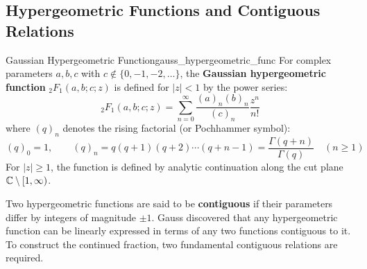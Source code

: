 \documentclass[a4paper]{article}
\begin{document}
\subsection{Hypergeometric Functions and Contiguous Relations}\label{cf:subsec:hypergeometric-and-contiguous-relations}

\begin{mydefinition}{Gaussian Hypergeometric Function}{gauss_hypergeometric_func}
  For complex parameters $a, b, c$ with $c \notin \{0, -1, -2, \dots\}$, the \textbf{Gaussian hypergeometric function} ${_2F_1}(a, b; c; z)$ is defined for $|z| < 1$ by the power series:
  \[
    {_2F_1}(a, b; c; z) = \sum_{n=0}^{\infty} \frac{(a)_n (b)_n}{(c)_n} \frac{z^n}{n!}
  \]
  where $(q)_n$ denotes the rising factorial (or Pochhammer symbol):
  \[
    (q)_0 = 1, \qquad (q)_n = q(q+1)(q+2)\cdots(q+n-1) = \frac{\Gamma(q+n)}{\Gamma(q)} \quad (n \ge 1)
  \]
  For $|z| \ge 1$, the function is defined by analytic continuation along the cut plane $\mathbb{C} \setminus [1, \infty)$.
\end{mydefinition}

Two hypergeometric functions are said to be \textbf{contiguous} if their parameters differ by integers of magnitude $\pm 1$.
Gauss discovered that any hypergeometric function can be linearly expressed in terms of any two functions contiguous to it.
To construct the continued fraction, two fundamental contiguous relations are required.
\end{document}
